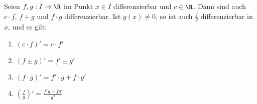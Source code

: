 Seien $f, g: I \to \R$ im Punkt $x \in I$ differenzierbar und $c \in \R$. Dann sind auch $c \cdot f$, $f+g$ und $f \cdot g$ differenzierbar. Ist $g(x) \neq 0$, so ist auch $\frac{f}{g}$ differenzierbar in $x$, und es gilt:
\begin{enumerate}
    \item {} $(c \cdot f)' = c \cdot f'$
    \item {} $(f \pm g)' = f' \pm g'$
    \item {} $(f \cdot g)' = f' \cdot g + f \cdot g'$
    \item {} $\left(\frac{f}{g}\right)' = \frac{f' g - f g'}{g^2}$
\end{enumerate}